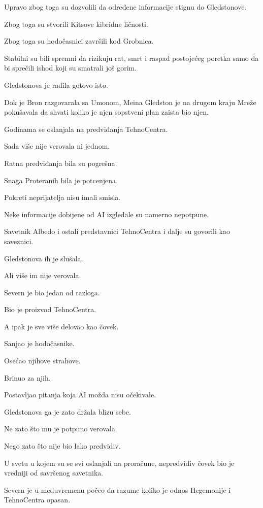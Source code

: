 \bigskip

Upravo zbog toga su dozvolili da određene informacije stignu do Gledstonove.

Zbog toga su stvorili Kitsove kibridne ličnosti.

Zbog toga su hodočasnici završili kod Grobnica.

Stabilni su bili spremni da rizikuju rat, smrt i raspad postojećeg poretka samo da bi sprečili ishod koji su smatrali još gorim.

Gledstonova je radila gotovo isto.

\bigskip

Dok je Bron razgovarala sa Umonom, Meina Gledston je na drugom kraju Mreže pokušavala da shvati koliko je njen sopstveni plan zaista bio njen.

Godinama se oslanjala na predviđanja TehnoCentra.

Sada više nije verovala ni jednom.

Ratna predviđanja bila su pogrešna.

Snaga Proteranih bila je potcenjena.

Pokreti neprijatelja nisu imali smisla.

Neke informacije dobijene od AI izgledale su namerno nepotpune.

Savetnik Albedo i ostali predstavnici TehnoCentra i dalje su govorili kao saveznici.

Gledstonova ih je slušala.

Ali više im nije verovala.

\bigskip

Severn je bio jedan od razloga.

Bio je proizvod TehnoCentra.

A ipak je sve više delovao kao čovek.

Sanjao je hodočasnike.

Osećao njihove strahove.

Brinuo za njih.

Postavljao pitanja koja AI možda nisu očekivale.

Gledstonova ga je zato držala blizu sebe.

Ne zato što mu je potpuno verovala.

Nego zato što nije bio lako predvidiv.

U svetu u kojem su se svi oslanjali na proračune, nepredvidiv čovek bio je vredniji od savršenog savetnika.

\bigskip

Severn je u međuvremenu počeo da razume koliko je odnos Hegemonije i TehnoCentra opasan.

